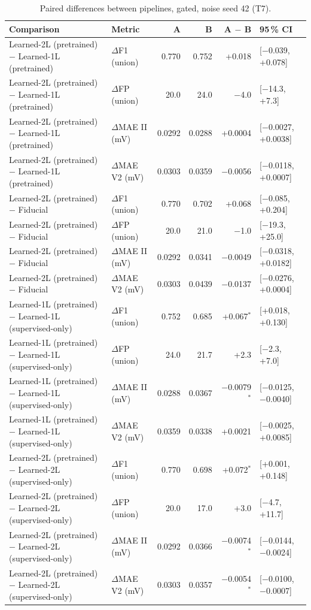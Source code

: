 \begin{table}[htbp]
\centering
\small
\caption{Paired differences between pipelines, gated, noise seed 42 (T7).}
\label{tab:t7_paired}
\begin{tabular}{llrrrl}
\toprule
Comparison & Metric & A & B & A $-$ B & 95\,\% CI \\
\midrule
Learned-2L (pretrained) $-$ Learned-1L (pretrained) & $\Delta$F1 (union) & 0.770 & 0.752 & +0.018 & [$-$0.039, +0.078] \\
Learned-2L (pretrained) $-$ Learned-1L (pretrained) & $\Delta$FP (union) & 20.0 & 24.0 & $-$4.0 & [$-$14.3, +7.3] \\
Learned-2L (pretrained) $-$ Learned-1L (pretrained) & $\Delta$MAE II (mV) & 0.0292 & 0.0288 & +0.0004 & [$-$0.0027, +0.0038] \\
Learned-2L (pretrained) $-$ Learned-1L (pretrained) & $\Delta$MAE V2 (mV) & 0.0303 & 0.0359 & $-$0.0056 & [$-$0.0118, +0.0007] \\
Learned-2L (pretrained) $-$ Fiducial & $\Delta$F1 (union) & 0.770 & 0.702 & +0.068 & [$-$0.085, +0.204] \\
Learned-2L (pretrained) $-$ Fiducial & $\Delta$FP (union) & 20.0 & 21.0 & $-$1.0 & [$-$19.3, +25.0] \\
Learned-2L (pretrained) $-$ Fiducial & $\Delta$MAE II (mV) & 0.0292 & 0.0341 & $-$0.0049 & [$-$0.0318, +0.0182] \\
Learned-2L (pretrained) $-$ Fiducial & $\Delta$MAE V2 (mV) & 0.0303 & 0.0439 & $-$0.0137 & [$-$0.0276, +0.0004] \\
Learned-1L (pretrained) $-$ Learned-1L (supervised-only) & $\Delta$F1 (union) & 0.752 & 0.685 & +0.067$^{*}$ & [+0.018, +0.130] \\
Learned-1L (pretrained) $-$ Learned-1L (supervised-only) & $\Delta$FP (union) & 24.0 & 21.7 & +2.3 & [$-$2.3, +7.0] \\
Learned-1L (pretrained) $-$ Learned-1L (supervised-only) & $\Delta$MAE II (mV) & 0.0288 & 0.0367 & $-$0.0079$^{*}$ & [$-$0.0125, $-$0.0040] \\
Learned-1L (pretrained) $-$ Learned-1L (supervised-only) & $\Delta$MAE V2 (mV) & 0.0359 & 0.0338 & +0.0021 & [$-$0.0025, +0.0085] \\
Learned-2L (pretrained) $-$ Learned-2L (supervised-only) & $\Delta$F1 (union) & 0.770 & 0.698 & +0.072$^{*}$ & [+0.001, +0.148] \\
Learned-2L (pretrained) $-$ Learned-2L (supervised-only) & $\Delta$FP (union) & 20.0 & 17.0 & +3.0 & [$-$4.7, +11.7] \\
Learned-2L (pretrained) $-$ Learned-2L (supervised-only) & $\Delta$MAE II (mV) & 0.0292 & 0.0366 & $-$0.0074$^{*}$ & [$-$0.0144, $-$0.0024] \\
Learned-2L (pretrained) $-$ Learned-2L (supervised-only) & $\Delta$MAE V2 (mV) & 0.0303 & 0.0357 & $-$0.0054$^{*}$ & [$-$0.0100, $-$0.0007] \\
\bottomrule
\end{tabular}


\end{table}
